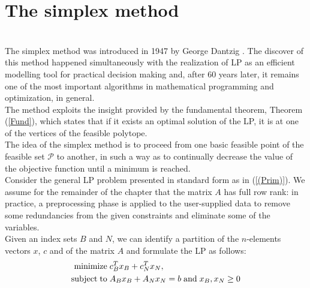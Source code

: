 \documentclass[a4paper,10 pt,titlepage,twoside]{report}
\theoremstyle{plain}
\theoremstyle{definition}
\theoremstyle{remark}
\begin{document}
\chapter{The simplex method}\\
The simplex method was introduced in 1947 by George Dantzig \cite{DAN1}. The discover of this method happened simultaneously with the realization of LP as an efficient modelling tool for practical decision making and, after 60 years later, it remains one of the most important algorithms in mathematical programming and
optimization, in general.\\
The method exploits the insight provided by the fundamental theorem, Theorem
(\ref{Fund}), which states that if it exists an optimal solution of the LP, it is at one of the vertices of the feasible polytope. \\
The idea of the simplex method is to proceed from one basic feasible point of the feasible set $\mathcal{P}$ to another, in such a way as to continually decrease the value of the objective
function until a minimum is reached.\\ Consider the general LP problem presented in standard form as in (\ref{(Prim)}).
We assume for the remainder of the chapter that the matrix $A$ has full row rank: in practice, a preprocessing phase is applied to the user-supplied data to remove some
redundancies from the given constraints and eliminate some of the variables.\\Given an index sets $B$ and $N$, we can identify a partition of the $n$-elements vectors $x$, $c$ and of the matrix $A$ and formulate the LP as follows:
\begin{equation}
\begin{split}
\text{minimize\;} &c^{T}_{B}x_{B}+c^{T}_{N}x_{N},\\
\text{subject\;to\;}&A_{B}x_{B}+A_{N}x_{N} = b\text{\;and\;}x_{B}, x_{N}\geq0
\end{split}
\end{equation}
\end{document}
